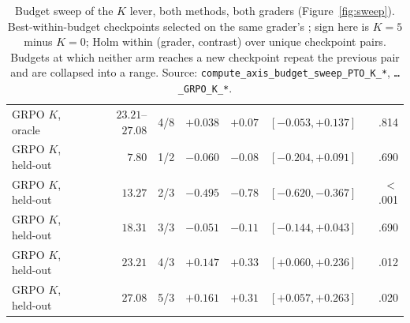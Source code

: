 \begin{table}[t]
\begin{tabular}{@{}l r c rrlr@{}}
GRPO $K$, oracle & $23.21$--$27.08$ & 4/8 & $+0.038$ & $+0.07$ & $[-0.053, +0.137]$ & .814 \\
\addlinespace[2pt]
GRPO $K$, held-out & $7.80$ & 1/2 & $-0.060$ & $-0.08$ & $[-0.204, +0.091]$ & .690 \\
GRPO $K$, held-out & $13.27$ & 2/3 & $-0.495$ & $-0.78$ & $[-0.620, -0.367]$ & $<$.001 \\
GRPO $K$, held-out & $18.31$ & 3/3 & $-0.051$ & $-0.11$ & $[-0.144, +0.043]$ & .690 \\
GRPO $K$, held-out & $23.21$ & 4/3 & $+0.147$ & $+0.33$ & $[+0.060, +0.236]$ & .012 \\
GRPO $K$, held-out & $27.08$ & 5/3 & $+0.161$ & $+0.31$ & $[+0.057, +0.263]$ & .020 \\
    \bottomrule
  \end{tabular}
  \caption{Budget sweep of the $K$ lever, both methods, both graders (Figure~\ref{fig:sweep}).
    Best-within-budget checkpoints selected on the same grader's \QQ{}; sign here is $K{=}5$ minus
    $K{=}0$; Holm within (grader, contrast) over unique checkpoint pairs. Budgets at which neither
    arm reaches a new checkpoint repeat the previous pair and are collapsed into a range. Source:
    \texttt{compute\_axis\_budget\_sweep\_PTO\_K\_*}, \texttt{\ldots\_GRPO\_K\_*}.}
  \label{tab:app:sweepK}
\end{table}

